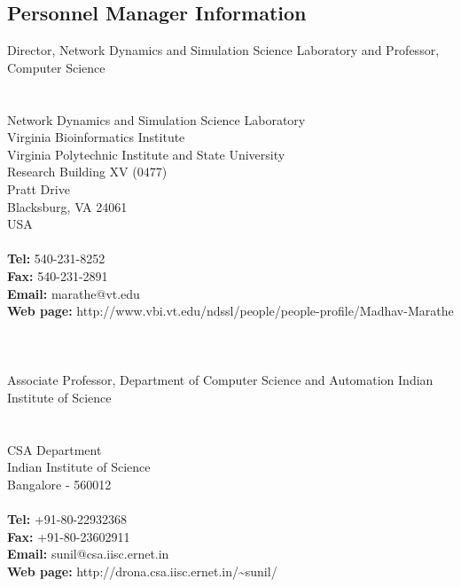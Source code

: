 \documentclass[margin,10pt]{res} %
\begin{document}
\begin{resume}
{\newpage
\section{Personnel Manager Information}

\noindent Director, Network Dynamics and Simulation Science Laboratory
and Professor, Computer Science\\
\\
 \\
\noindent Network Dynamics and Simulation Science Laboratory \\
\noindent Virginia Bioinformatics Institute \\
\noindent Virginia Polytechnic Institute and State University \\
\noindent Research Building XV (0477) \\
 Pratt Drive \\
\noindent Blacksburg, VA 24061 \\
\noindent USA \\
\\
{\bf Tel:} 540-231-8252\\
{\bf Fax:} 540-231-2891\\
{\bf Email:} marathe@vt.edu\\
{\bf Web page:}
http://www.vbi.vt.edu/ndssl/people/people-profile/Madhav-Marathe \\
\\
\\
\\
Associate Professor,
Department of Computer Science and Automation
Indian Institute of Science\\
\\
 \\
CSA Department\\
Indian Institute of Science\\
Bangalore - 560012\\
\\
{\bf Tel:} +91-80-22932368\\
{\bf Fax:} +91-80-23602911 \\
{\bf Email:} sunil@csa.iisc.ernet.in\\
{\bf Web page:} http://drona.csa.iisc.ernet.in/\textasciitilde sunil/


   }{}
\end{resume}

\end{document}
